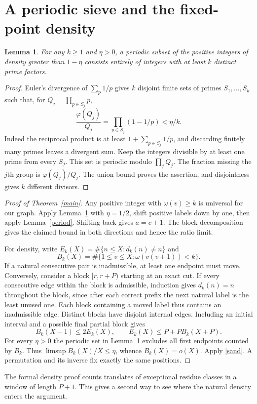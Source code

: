 \documentclass[11pt]{article}
\newtheorem{lemma}[theorem]{Lemma}
\newcommand{\card}{\#}
\begin{document}
\clearpage
\section{A periodic sieve and the fixed-point density}
\begin{lemma}\label{sieve}
For any $k\ge1$ and $\eta>0$, a periodic subset of the positive integers of density greater than $1-\eta$ consists entirely of integers with at least $k$ distinct prime factors.
\end{lemma}
\begin{proof}
Euler's divergence of $\sum_p1/p$ gives $k$ disjoint finite sets of primes $S_1,\ldots,S_k$ such that, for $Q_j=\prod_{p\in S_j}p$,
\[
 \frac{\varphi(Q_j)}{Q_j}=\prod_{p\in S_j}(1-1/p)<\eta/k.
\]
Indeed the reciprocal product is at least $1+\sum_{p\in S_j}1/p$, and discarding finitely many primes leaves a divergent sum. Keep the integers divisible by at least one prime from every $S_j$. This set is periodic modulo $\prod_jQ_j$. The fraction missing the $j$th group is $\varphi(Q_j)/Q_j$. The union bound proves the assertion, and disjointness gives $k$ different divisors.
\end{proof}
\begin{proof}[Proof of Theorem~\ref{main}]
Any positive integer with $\omega(v)\ge k$ is universal for our graph. Apply Lemma~\ref{sieve} with $\eta=1/2$, shift positive labels down by one, then apply Lemma~\ref{period}. Shifting back gives $a=c+1$. The block decomposition gives the claimed bound in both directions and hence the ratio limit.

For density, write $E_k(X)=\card\{n\le X:d_k(n)\ne n\}$ and
\[
 B_k(X)=\card\{1\le v\le X:\omega(v(v+1))<k\}.
\]
If a natural consecutive pair is inadmissible, at least one endpoint must move. Conversely, consider a block $[r,r+P)$ starting at an exact cut. If every consecutive edge within the block is admissible, induction gives $d_k(n)=n$ throughout the block, since after each correct prefix the next natural label is the least unused one. Each block containing a moved label thus contains an inadmissible edge. Distinct blocks have disjoint internal edges. Including an initial interval and a possible final partial block gives
\begin{equation}\label{sand}
 B_k(X-1)\le2E_k(X),\qquad E_k(X)\le P+P B_k(X+P).
\end{equation}
For every $\eta>0$ the periodic set in Lemma~\ref{sieve} excludes all first endpoints counted by $B_k$. Thus $\limsup B_k(X)/X\le\eta$, whence $B_k(X)=o(X)$. Apply \eqref{sand}. A permutation and its inverse fix exactly the same positions.
\end{proof}
The formal density proof counts translates of exceptional residue classes in a window of length $P+1$. This gives a second way to see where the natural density enters the argument.
\end{document}
